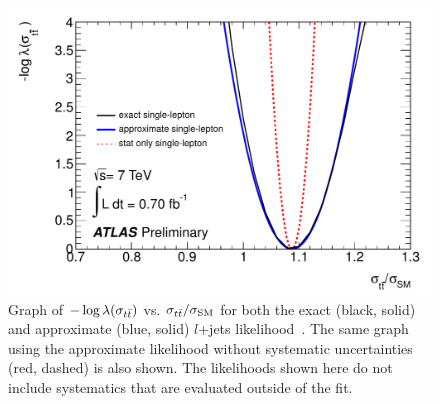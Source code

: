 \begin{figure}[htbp]
  \begin{center}
    \includegraphics[width=.5\textwidth]{figures/comb/ljets_likelihood_curve}
    \caption{Graph of $-\log\lambda(\sigma_{t\bar{t}})$ vs. $\sigma_{t\bar{t}}/\sigma_{\rm SM}$ for both the exact (black, solid) and approximate (blue, solid) $l$+jets likelihood~\cite{lepjetsCONF}.  The same graph using the approximate likelihood without systematic uncertainties (red, dashed) is also shown.  The likelihoods shown here do not include systematics that are evaluated outside of the fit.}
    \label{fig:ljets_combined}
  \end{center}
\end{figure}




